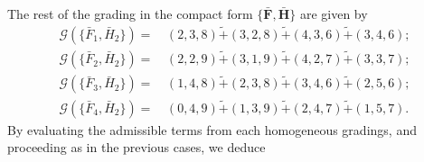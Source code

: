 \documentclass[10pt]{amsart}
\theoremstyle{definition}
\theoremstyle{corollary}
\theoremstyle{remark}
\theoremstyle{conclusion}
\begin{document}
The rest of the grading in the compact form $\{\bar{\textbf{F}},\bar{\textbf{H}}\}$ are given by  
    \begin{align}
    \mathcal{G} \left(\{\bar{F}_1, \bar{H}_2\}\right)  = & \, (2,3,8) \tilde{+} (3,2,8)\tilde{+} (4,3,6)\tilde{+} (3,4,6); \nonumber \\
    \mathcal{G} \left(\{\bar{F}_2, \bar{H}_2\}\right)  = & \, (2,2,9) \tilde{+} (3,1,9)\tilde{+} (4,2,7)\tilde{+} (3,3,7); \nonumber \\
    \mathcal{G} \left(\{\bar{F}_3, \bar{H}_2\}\right)  = & \, (1,4,8) \tilde{+} (2,3,8)\tilde{+} (3,4,6)\tilde{+} (2,5,6); \nonumber \\
    \mathcal{G} \left(\{\bar{F}_4, \bar{H}_2\}\right)  = & \, (0,4,9) \tilde{+} (1,3,9)\tilde{+} (2,4,7)\tilde{+} (1,5,7).
\end{align} 
By evaluating the  admissible terms from each homogeneous gradings,  and proceeding as in the previous cases, we  deduce 
\end{document}
